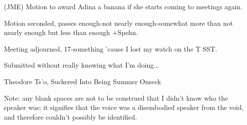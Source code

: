 \documentclass[12pt]{article}
\begin{document}
(JME) Motion to award Adina a banana if she starts coming to meetings again.

Motion seconded, passes enough-not nearly enough-somewhat more than not nearly enough but less than enough +Spehn.

\vspace{12pt}

\noindent
Meeting adjourned, 17-something 'cause I lost my watch on the T SST.

\vspace{18pt}

\centerline{Submitted without really knowing what I'm doing...}
\centerline{Theodore Ts'o, Suckered Into Being Summer Onseck}
\centerline{Note: any blank spaces are not to be construed that I didn't know who the speaker was; it signifies that the voice was a disembodied speaker from the void, and therefore couldn't possibly be identified.}
\end{document}
